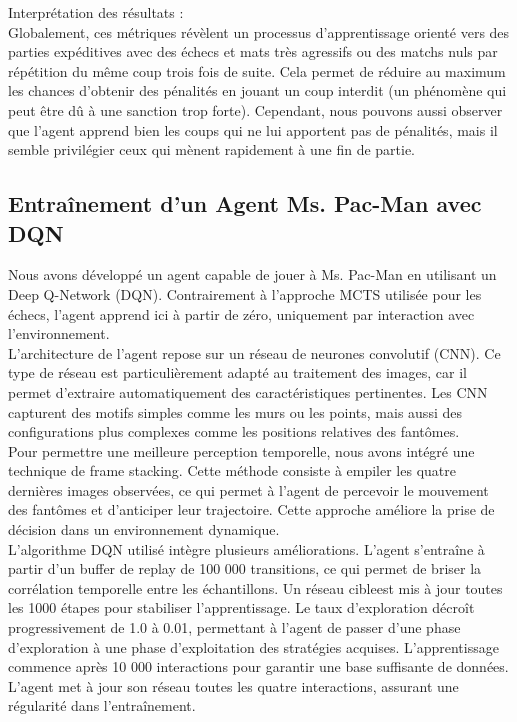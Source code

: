 \documentclass{article}
\begin{document}
    Interprétation des résultats :\\

    Globalement, ces métriques révèlent un processus d'apprentissage orienté vers des parties expéditives avec des échecs et mats très agressifs ou des matchs nuls par répétition du même coup trois fois de suite. Cela permet de réduire au maximum les chances d'obtenir des pénalités en jouant un coup interdit (un phénomène qui peut être dû à une sanction trop forte). Cependant, nous pouvons aussi observer que l'agent apprend bien les coups qui ne lui apportent pas de pénalités, mais il semble privilégier ceux qui mènent rapidement à une fin de partie.

\clearpage

\subsection{Entraînement d'un Agent Ms. Pac-Man avec DQN}

\quad Nous avons développé un agent capable de jouer à Ms. Pac-Man en utilisant un Deep Q-Network (DQN). Contrairement à l’approche MCTS utilisée pour les échecs, l’agent apprend ici à partir de zéro, uniquement par interaction avec l’environnement.\\

L’architecture de l’agent repose sur un réseau de neurones convolutif (CNN). Ce type de réseau est particulièrement adapté au traitement des images, car il permet d’extraire automatiquement des caractéristiques pertinentes. Les CNN capturent des motifs simples comme les murs ou les points, mais aussi des configurations plus complexes comme les positions relatives des fantômes.\\

Pour permettre une meilleure perception temporelle, nous avons intégré une technique de frame stacking. Cette méthode consiste à empiler les quatre dernières images observées, ce qui permet à l’agent de percevoir le mouvement des fantômes et d’anticiper leur trajectoire. Cette approche améliore la prise de décision dans un environnement dynamique.\\

L’algorithme DQN utilisé intègre plusieurs améliorations. L’agent s’entraîne à partir d’un buffer de replay de 100 000 transitions, ce qui permet de briser la corrélation temporelle entre les échantillons. Un réseau cibleest mis à jour toutes les 1000 étapes pour stabiliser l’apprentissage. Le taux d’exploration décroît progressivement de 1.0 à 0.01, permettant à l’agent de passer d’une phase d’exploration à une phase d’exploitation des stratégies acquises. L’apprentissage commence après 10 000 interactions pour garantir une base suffisante de données. L’agent met à jour son réseau toutes les quatre interactions, assurant une régularité dans l’entraînement.\\
\end{document}

